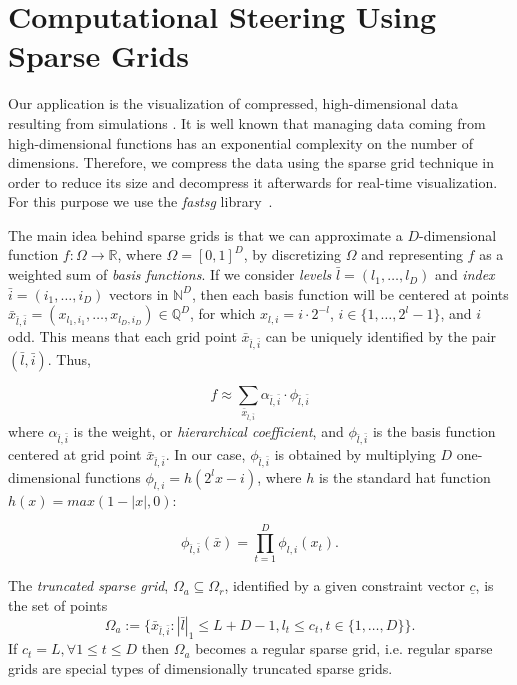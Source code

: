 \section{Computational Steering Using Sparse Grids}
\label{sec:comp_steering}

Our application is the visualization of compressed, high-dimensional data
resulting from simulations \cite{Butnaru201156}. It is well known that managing
data coming from high-dimensional functions has an exponential complexity on the
number of dimensions. Therefore, we compress the data using the sparse grid
technique in order to reduce its size and decompress it afterwards for real-time
visualization. For this purpose we use the \textit{fastsg}
library~\cite{murarasu12fastsg:}.

The main idea behind sparse grids is that we can approximate a $D$-dimensional
function $f : \Omega \rightarrow \mathbb{R}$, where $\Omega = [0, 1]^{D}$, by
discretizing $\Omega$ and representing $f$ as a weighted sum of \textit{basis
functions}. If we consider \textit{levels} $\bar{l} = (l_{1},\ldots,l_{D})$ and
\textit{index} $\bar{i} = (i_{1},\ldots,i_{D})$ vectors in $\mathbb{N}^{D}$,
then each basis function will be centered at points $\bar{x}_{\bar{l},\bar{i}} =
(x_{l_{1},i_{1}},\ldots,x_{l_{D},i_{D}}) \in \mathbb{Q}^{D}$, for which $x_{l,i}
= i \cdot 2^{-l}$, $i \in \{1,\ldots,2^{l} - 1\}$, and $i$ odd. This means that
each grid point $\bar{x}_{\bar{l},\bar{i}}$ can be uniquely identified by the
pair $(\bar{l},\bar{i})$. Thus,

\[ f \approx \sum_{\bar{x}_{\bar{l},\bar{i}}} \alpha_{\bar{l},\bar{i}} \cdot
\phi_{\bar{l},\bar{i}} \]
where $\alpha_{\bar{l},\bar{i}}$ is the weight, or \textit{hierarchical
coefficient}, and $\phi_{\bar{l},\bar{i}}$ is the basis function centered at
grid point $\bar{x}_{\bar{l},\bar{i}}$. In our case, $\phi_{\bar{l},\bar{i}}$ is
obtained by multiplying $D$ one-dimensional functions $\phi_{l,i} = h(2^{l}x -
i)$, where $h$ is the standard hat function $h(x) = max(1 - |x|, 0)$:

\[ \phi_{\bar{l},\bar{i}}(\bar{x}) = \prod_{t=1}^{D} \phi_{l,i}(x_{t}) .\]

The \textit{truncated sparse grid}, $\Omega_a \subseteq \Omega_r$, identified by
a given constraint vector $\underline{c}$, is the set of points
\begin{equation*}
\Omega_a := \{\bar{x}_{\bar{l}, \bar{i}} : |\bar{l}|_1 \leq L
+ D - 1, l_t \leq c_t,  t \in \{1, \dots, D\}\}.
\end{equation*}
If $c_t = L, \forall 1 \leq t \leq D$ then $\Omega_a$ becomes a regular sparse
grid, i.e. regular sparse grids are special types of dimensionally truncated
sparse grids.


